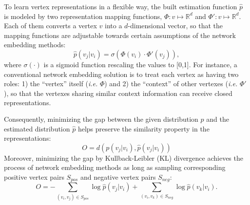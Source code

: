 

To learn vertex representations in a flexible way, the built estimation function $\hat{p}$ is modeled by two representation mapping functions, $\Phi: v \mapsto \mathbb{R}^{d}$ and $\Phi': v \mapsto \mathbb{R}^{d}$. Each of them converts a vertex $v$ into a $d$-dimensional vector, so that the mapping functions are adjustable towards certain assumptions of the network embedding methods:
\begin{equation}
\hat{p}(v_{j}|v_{i}) = \sigma( \Phi(v_{i}) \cdot \Phi'(v_{j}) ),
\label{eq:p}
\end{equation}
where $\sigma(\cdot)$ is a sigmoid function rescaling the values to [0,1]. For instance, a conventional network embedding solution is to treat each vertex as having two roles: 1) the ``vertex'' itself (\textit{i.e.} $\Phi$) and 2) the ``context'' of other vertexes (\textit{i.e.} $\Phi'$), so that the vertexes sharing similar context information can receive closed representations.

Consequently, minimizing the gap between the given distribution $p$ and the estimated distribution $\hat{p}$ helps preserve the similarity property in the representations:
\begin{equation}
    O = d(p(v_{j}|v_{i}), \hat{p}(v_{j}|v_{i}))
\label{eq:objective}
\end{equation}
Moreover, minimizing the gap by Kullback-Leibler (KL) divergence achieves the process of network embedding methods as long as sampling corresponding positive vertex pairs $S_{pos}$ and negative vertex pairs $S_{neg}$:
\begin{equation}
O = - \sum_{(v_{i},v_{j})\in S_{pos}} \log \hat{p}(v_{j}|v_{i})
 + \sum_{(v_{i},v_{k})\in S_{neg}} \log \hat{p}(v_{k}|v_{i}).
\label{eq:obj}
\end{equation}

